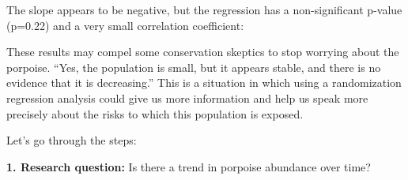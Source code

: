 \documentclass[
]{book}
\newenvironment{Shaded}{\begin{snugshade}}{\end{snugshade}}
\newcommand{\DataTypeTok}[1]{\textcolor[rgb]{0.13,0.29,0.53}{#1}}
\newcommand{\DecValTok}[1]{\textcolor[rgb]{0.00,0.00,0.81}{#1}}
\newcommand{\ErrorTok}[1]{\textcolor[rgb]{0.64,0.00,0.00}{\textbf{#1}}}
\newcommand{\FloatTok}[1]{\textcolor[rgb]{0.00,0.00,0.81}{#1}}
\newcommand{\KeywordTok}[1]{\textcolor[rgb]{0.13,0.29,0.53}{\textbf{#1}}}
\newcommand{\NormalTok}[1]{#1}
\newcommand{\OperatorTok}[1]{\textcolor[rgb]{0.81,0.36,0.00}{\textbf{#1}}}
\newcommand{\StringTok}[1]{\textcolor[rgb]{0.31,0.60,0.02}{#1}}
\begin{document}
The slope appears to be negative, but the regression has a non-significant p-value (p=0.22) and a very small correlation coefficient:

\begin{Shaded}
\end{Shaded}

These results may compel some conservation skeptics to stop worrying about the porpoise. ``Yes, the population is small, but it appears stable, and there is no evidence that it is decreasing.'' This is a situation in which using a randomization regression analysis could give us more information and help us speak more precisely about the risks to which this population is exposed.

Let's go through the steps:

\textbf{1. Research question:} Is there a trend in porpoise abundance over time?
\end{document}
